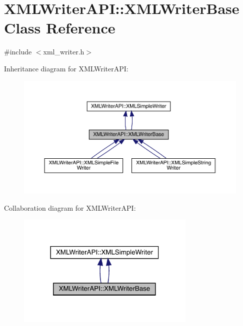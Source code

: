 \hypertarget{classXMLWriterAPI_1_1XMLWriterBase}{}\section{X\+M\+L\+Writer\+A\+PI\+:\+:X\+M\+L\+Writer\+Base Class Reference}
\label{classXMLWriterAPI_1_1XMLWriterBase}


{\ttfamily \#include $<$xml\+\_\+writer.\+h$>$}



Inheritance diagram for X\+M\+L\+Writer\+A\+PI\+:\nopagebreak
\begin{figure}[H]
\begin{center}
\leavevmode
\includegraphics[width=350pt]{dc/d9f/classXMLWriterAPI_1_1XMLWriterBase__inherit__graph}
\end{center}
\end{figure}


Collaboration diagram for X\+M\+L\+Writer\+A\+PI\+:\nopagebreak
\begin{figure}[H]
\begin{center}
\leavevmode
\includegraphics[width=242pt]{da/d4e/classXMLWriterAPI_1_1XMLWriterBase__coll__graph}
\end{center}
\end{figure}
